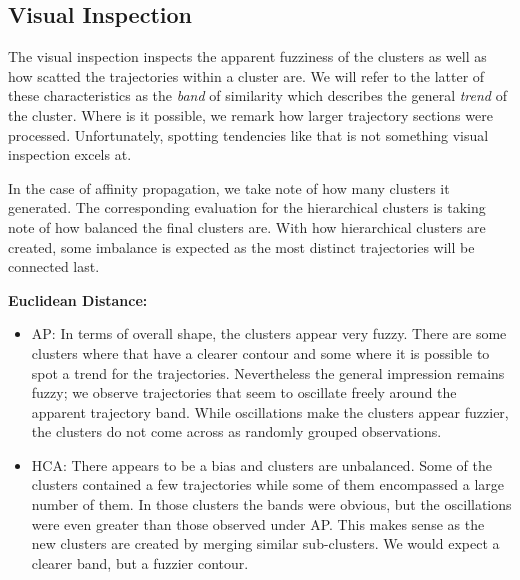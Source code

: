 



\subsection{Visual Inspection}

The visual inspection inspects the apparent fuzziness of the clusters as well as how scatted the trajectories within a cluster are. 
We will refer to the latter of these characteristics as the \textit{band} of similarity which describes the general \textit{trend} of the cluster. 
Where is it possible, we remark how larger trajectory sections were processed. 
Unfortunately, spotting tendencies like that is not something visual inspection excels at.

In the case of affinity propagation, we take note of how many clusters it generated. 
The corresponding evaluation for the hierarchical clusters is taking note of how balanced the final clusters are.
With how hierarchical clusters are created, some imbalance is expected as the most distinct trajectories will be connected last.


\textbf{Euclidean Distance:}
\begin{itemize}
\item AP:  In terms of overall shape, the clusters appear very fuzzy. 
There are some clusters where that have a clearer contour and some where it is possible to spot a trend for the trajectories. 
Nevertheless the general impression remains fuzzy; we observe trajectories that seem to oscillate freely around the apparent trajectory band.
While oscillations make the clusters appear fuzzier, the clusters do not come across as randomly grouped observations. 

\medskip
\item HCA: There appears to be a bias and clusters are unbalanced. 
Some of the clusters contained a few trajectories while some of them encompassed a large number of them.
In those clusters the bands were obvious, but the oscillations were even greater than those observed under AP.
This makes sense as the new clusters are created by merging similar sub-clusters. 
We would expect a clearer band, but a fuzzier contour. 
\end{itemize}

